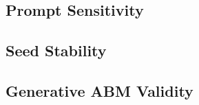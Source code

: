 \subsection{Prompt Sensitivity}
%

\subsection{Seed Stability}

\subsection{Generative ABM Validity}
